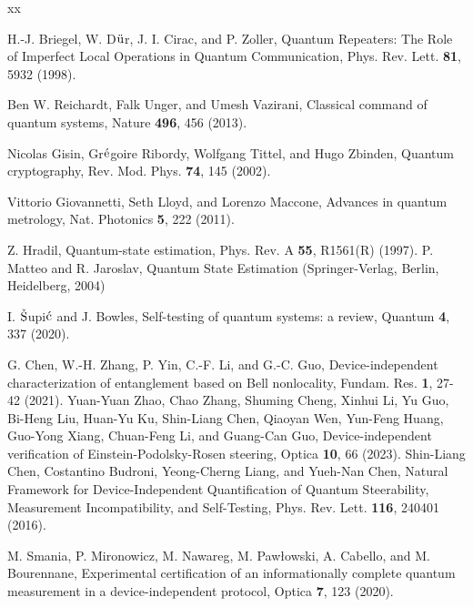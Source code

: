 \documentclass[letterpaper,preprint,superscriptaddress,floatfix,showpacs]{revtex4}
\begin{document}
\begin{thebibliography}{xx}


 H.-J. Briegel, W. D$\rm \ddot{u}$r, J. I. Cirac, and P. Zoller, Quantum Repeaters: The Role of Imperfect Local Operations in Quantum Communication, Phys. Rev. Lett. {\bf 81}, 5932 (1998).

 Ben W. Reichardt, Falk Unger, and Umesh Vazirani, Classical command of quantum systems, Nature {\bf 496}, 456 (2013).

 Nicolas Gisin, Gr$\rm \acute{e}$goire Ribordy, Wolfgang Tittel, and Hugo Zbinden, Quantum cryptography, Rev. Mod. Phys. {\bf 74}, 145 (2002).

 Vittorio Giovannetti, Seth Lloyd, and Lorenzo Maccone, Advances in quantum metrology, Nat. Photonics {\bf 5}, 222 (2011).

 Z. Hradil, Quantum-state estimation, Phys. Rev. A {\bf 55}, R1561(R) (1997).
 P. Matteo and R. Jaroslav, Quantum State Estimation (Springer-Verlag, Berlin, Heidelberg, 2004)


 I. $\rm \check{S}$upi$\rm \acute{c}$ and J. Bowles, Self-testing of quantum systems: a review, Quantum {\bf 4}, 337 (2020).





 G. Chen, W.-H. Zhang, P. Yin, C.-F. Li, and G.-C. Guo, Device-independent characterization of entanglement based on Bell nonlocality, Fundam. Res. {\bf 1}, 27-42 (2021).
 Yuan-Yuan Zhao, Chao Zhang, Shuming Cheng, Xinhui Li, Yu Guo, Bi-Heng Liu, Huan-Yu Ku, Shin-Liang Chen, Qiaoyan Wen, Yun-Feng Huang, Guo-Yong Xiang, Chuan-Feng Li, and Guang-Can Guo, Device-independent verification of Einstein-Podolsky-Rosen steering, Optica {\bf 10}, 66 (2023).
 Shin-Liang Chen, Costantino Budroni, Yeong-Cherng Liang, and Yueh-Nan Chen, Natural Framework for Device-Independent Quantification of Quantum Steerability, Measurement Incompatibility, and Self-Testing, Phys. Rev. Lett. {\bf 116}, 240401 (2016).












 M. Smania, P. Mironowicz, M. Nawareg, M. Paw{\l}owski, A. Cabello, and M. Bourennane, Experimental certification of an informationally complete quantum measurement in a device-independent protocol, Optica {\bf 7}, 123 (2020).


\end{thebibliography}
\end{document}
